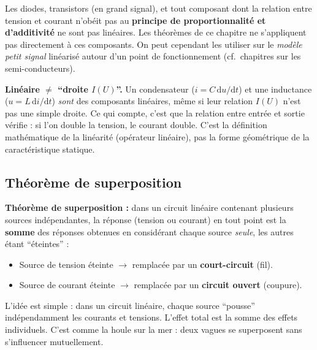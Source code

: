 \documentclass[12pt,a4paper,twoside]{book}
\begin{document}
\begin{attention}
Les diodes, transistors (en grand signal), et tout composant dont la relation entre tension et courant n'obéit pas au \textbf{principe de proportionnalité et d'additivité} ne sont pas linéaires. Les théorèmes de ce chapitre ne s'appliquent pas directement à ces composants. On peut cependant les utiliser sur le \textit{modèle petit signal} linéarisé autour d'un point de fonctionnement (cf.\ chapitres sur les semi-conducteurs).

\begin{attention}
\textbf{Linéaire $\neq$ ``droite $I(U)$''.} Un condensateur ($i = C\,\mathrm{d}u/\mathrm{d}t$) et une inductance ($u = L\,\mathrm{d}i/\mathrm{d}t$) \textit{sont} des composants linéaires, même si leur relation $I(U)$ n'est pas une simple droite. Ce qui compte, c'est que la relation entre entrée et sortie vérifie : si l'on double la tension, le courant double. C'est la définition mathématique de la linéarité (opérateur linéaire), pas la forme géométrique de la caractéristique statique.
\end{attention}
\end{attention}

\subsection{Théorème de superposition}

\begin{formule}
\textbf{Théorème de superposition :} dans un circuit linéaire contenant plusieurs sources indépendantes, la réponse (tension ou courant) en tout point est la \textbf{somme} des réponses obtenues en considérant chaque source \textit{seule}, les autres étant ``éteintes'' :
\begin{itemize}[nosep]
\item Source de tension éteinte $\rightarrow$ remplacée par un \textbf{court-circuit} (fil).
\item Source de courant éteinte $\rightarrow$ remplacée par un \textbf{circuit ouvert} (coupure).
\end{itemize}
\end{formule}

\begin{intuition}
L'idée est simple : dans un circuit linéaire, chaque source ``pousse'' indépendamment les courants et tensions. L'effet total est la somme des effets individuels. C'est comme la houle sur la mer : deux vagues se superposent sans s'influencer mutuellement.
\end{intuition}
\end{document}
